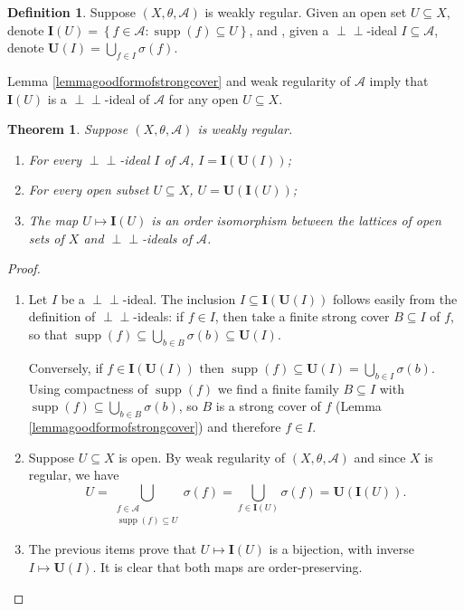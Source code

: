 \documentclass[letter,11pt]{amsart}
\theoremstyle{plain}		\newtheorem{theorem}[generalnumbering]{Theorem}
\theoremstyle{plain}		\newtheorem{corollary}[generalnumbering]{Corollary}
\theoremstyle{definition}		\newtheorem{definition}[generalnumbering]{Definition}
\theoremstyle{definition}		\newtheorem{example}[generalnumbering]{Example}
\theoremstyle{plain}		\newtheorem{proposition}[generalnumbering]{Proposition}
\theoremstyle{plain}		\newtheorem{lemma}[generalnumbering]{Lemma}
\theoremstyle{definition}
\newcommand{\perpp}{\perp\!\!\!\perp}
\DeclareMathOperator{\supp}{supp}
\begin{document}
\begin{definition}
	Suppose $(X,\theta,\mathcal{A})$ is weakly regular. Given an open set $U\subseteq X$, denote $\mathbf{I}(U)=\left\{f\in\mathcal{A}:\supp(f)\subseteq U\right\}$, and , given a $\perpp$-ideal $I\subseteq\mathcal{A}$, denote $\mathbf{U}(I)=\bigcup_{f\in I}\sigma(f)$.
\end{definition}

Lemma \ref{lemmagoodformofstrongcover} and weak regularity of $\mathcal{A}$ imply that $\mathbf{I}(U)$ is a $\perpp$-ideal of $\mathcal{A}$ for any open $U\subseteq X$.

\begin{theorem}\label{theoremperppideals}
	Suppose $(X,\theta,\mathcal{A})$ is weakly regular.
	\begin{enumerate}[label=(\alph*)]
		\item\label{theoremperppideals(a)} For every $\perpp$-ideal $I$ of $\mathcal{A}$, $I=\mathbf{I}(\mathbf{U}(I))$;
		\item\label{theoremperppideals(b)} For every open subset $U\subseteq X$, $U=\mathbf{U}(\mathbf{I}(U))$;
		\item\label{theoremperppideals(c)} The map $U\mapsto\mathbf{I}(U)$ is an order isomorphism between the lattices of open sets of $X$ and $\perpp$-ideals of $\mathcal{A}$.
	\end{enumerate}
\end{theorem}
\begin{proof}
	\begin{enumerate}[label=(\alph*)]
		\item Let $I$ be a $\perpp$-ideal. The inclusion $I\subseteq \mathbf{I}(\mathbf{U}(I))$ follows easily from the definition of $\perpp$-ideals: if $f\in I$, then take a finite strong cover $B\subseteq I$ of $f$, so that $\supp(f)\subseteq\bigcup_{b\in B}\sigma(b)\subseteq\mathbf{U}(I)$.
		
		Conversely, if $f\in\mathbf{I}(\mathbf{U}(I))$ then $\supp(f)\subseteq\mathbf{U}(I)=\bigcup_{b\in I}\sigma(b)$. Using compactness of $\supp(f)$ we find a finite family $B\subseteq I$ with $\supp(f)\subseteq\bigcup_{b\in B}\sigma(b)$, so $B$ is a strong cover of $f$ (Lemma \ref{lemmagoodformofstrongcover}) and therefore $f\in I$.
		\item Suppose $U\subseteq X$ is open. By weak regularity of $(X,\theta,\mathcal{A})$ and since $X$ is regular, we have
		\[U=\bigcup_{\substack{f\in\mathcal{A}\\\supp(f)\subseteq U}}\sigma(f)=\bigcup_{f\in\mathbf{I}(U)}\sigma(f)=\mathbf{U}(\mathbf{I}(U)).\]
		\item The previous items prove that $U\mapsto\mathbf{I}(U)$ is a bijection, with inverse $I\mapsto\mathbf{U}(I)$. It is clear that both maps are order-preserving.\qedhere
	\end{enumerate}
\end{proof}
\end{document}
